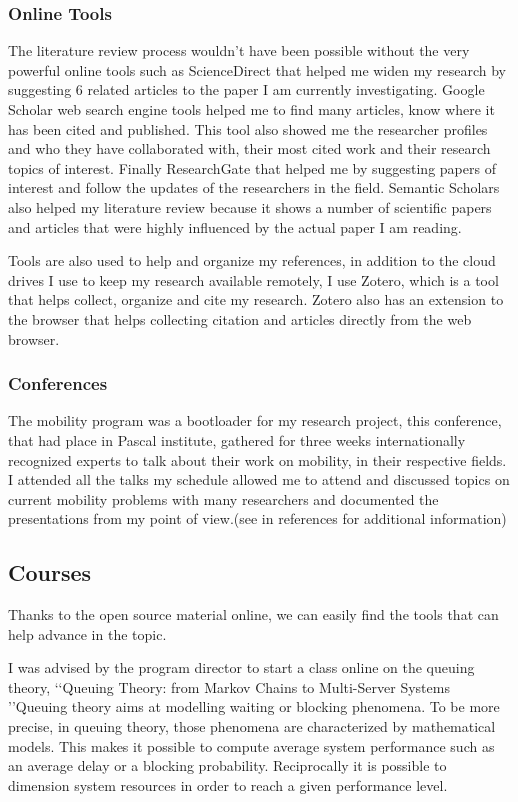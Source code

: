 \documentclass{article}
\begin{document}
\subsubsection{Online Tools}
\label{subsec:onlinetools}

The literature review process wouldn\rq{t} have been possible without the very powerful online tools such as ScienceDirect that helped me widen my research by suggesting $6$ related articles to the paper I am currently investigating.
Google Scholar web search engine tools helped me to find many articles, know where it has been cited and published. This tool also showed me the researcher profiles and who they have collaborated with, their most cited work and their research topics of interest. Finally ResearchGate that helped me by suggesting papers of interest and follow the updates of the researchers in the field.
Semantic Scholars also helped my literature review because it shows a number of scientific papers and articles that were highly influenced by the actual paper I am reading.

Tools are also used to help and organize my references, in addition to the cloud drives I use to keep my research available remotely, I use Zotero, which is a tool that helps collect, organize and cite my research. Zotero also has an extension to the browser that helps collecting citation and articles directly from the web browser. 

\subsubsection{Conferences}

The mobility program was a bootloader for my research project, this conference, that had place in Pascal institute, gathered for three weeks internationally recognized experts to talk about their work on mobility, in their respective fields. I attended all the talks my schedule allowed me to attend and discussed topics on current mobility problems with many researchers and documented the presentations from my point of view.(see in references \cite{mobility_program} for additional information) 

  
\subsection{Courses}
\label{subsec:online}
Thanks to the open source material online, we can easily find the tools that can help advance in the topic.

I was advised by the program director to start a class online on the queuing theory, \lq\lq{Queuing Theory: from Markov Chains to Multi-Server Systems }\rq\rq Queuing theory aims at modelling waiting or blocking phenomena. To be more precise, in queuing theory, those phenomena are characterized by mathematical models. This makes it possible to compute average system performance such as an average delay or a blocking probability. Reciprocally it is possible to dimension system resources in order to reach a given performance level.
\end{document}
